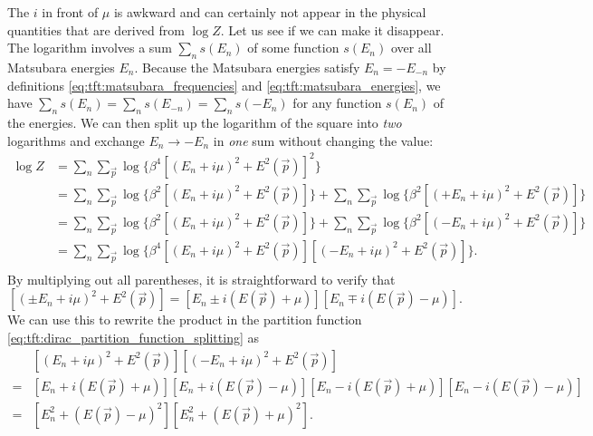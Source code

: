 The $i$ in front of $\mu$ is awkward and can certainly not appear in the physical quantities that are derived from $\log Z$.
Let us see if we can make it disappear.
The logarithm involves a sum $\sum_n s(E_n)$ of some function $s(E_n)$ over all Matsubara energies $E_n$.
Because the Matsubara energies satisfy $E_n = -E_{-n}$ by definitions \eqref{eq:tft:matsubara_frequencies} and \eqref{eq:tft:matsubara_energies}, we have
$\sum_n s(E_n) = \sum_n s(E_{-n}) = \sum_n s(-E_n)$ for any function $s(E_n)$ of the energies.
We can then split up the logarithm of the square into \emph{two} logarithms and exchange $E_n \rightarrow -E_n$ in \emph{one} sum without changing the value:
\begin{equation}
\begin{split}
	\log Z & = \sum_n \sum_\vec{p} \log \Big\{ \beta^4 \left[ ( E_n + i \mu)^2 + E^2(\vec{p})  \right]^2 \Big\}   \\
	       & = \sum_n \sum_\vec{p} \log \Big\{ \beta^2 \left[ ( E_n + i \mu)^2 + E^2(\vec{p})  \right]   \Big\}
	         + \sum_n \sum_\vec{p} \log \Big\{ \beta^2 \left[ (+E_n + i \mu)^2 + E^2(\vec{p})  \right]   \Big\}   \\
	       & = \sum_n \sum_\vec{p} \log \Big\{ \beta^2 \left[ ( E_n + i \mu)^2 + E^2(\vec{p})  \right]   \Big\}
	         + \sum_n \sum_\vec{p} \log \Big\{ \beta^2 \left[ (-E_n + i \mu)^2 + E^2(\vec{p}) \right]   \Big\}   \\
	       & = \sum_n \sum_\vec{p} \log \Big\{ \beta^4 \left[ ( E_n + i \mu)^2 + E^2(\vec{p})  \right] 
	                                                   \left[ (-E_n + i \mu)^2 + E^2(\vec{p}) \right]   \Big\} . \\
\end{split}
\label{eq:tft:dirac_partition_function_splitting}
\end{equation}
By multiplying out all parentheses, it is straightforward to verify that
\begin{equation}
	\left[ (\pm E_n + i \mu)^2 + E^2(\vec{p}) \right] = \left[ E_n \pm i (E(\vec{p}) + \mu) \right] \left[ E_n \mp i(E(\vec{p}) - \mu) \right] .
\end{equation}
We can use this to rewrite the product in the partition function \eqref{eq:tft:dirac_partition_function_splitting} as
\begin{equation}
\begin{split}
	 & \left[ (E_n + i \mu)^2 + E^2(\vec{p}) \right] \left[ (-E_n + i \mu)^2 + E^2(\vec{p}) \right] \\
	=& \left[ E_n + i (E(\vec{p}) + \mu) \right] \left[ E_n + i (E(\vec{p}) - \mu) \right] \left[ E_n - i (E(\vec{p}) + \mu) \right] \left[ E_n - i (E(\vec{p}) - \mu) \right] \\
	=& \left[ E_n^2 + (E(\vec{p}) - \mu)^2 \right] \left[ E_n^2 + (E(\vec{p}) + \mu)^2 \right] . \\
\end{split}
\end{equation}
